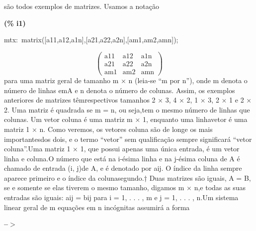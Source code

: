 \documentclass[fleqn]{article}
\begin{document}
são todos exemplos de matrizes. Usamos a notação


\noindent
\begin{minipage}[t]{4.000000em}\color{red}\bfseries
(\% i1)	
\end{minipage}
\begin{minipage}[t]{\textwidth}\color{blue}
mtx:\ matrix([a11,a12,a1n],[a21,a22,a2n],[am1,am2,amn]);
\end{minipage}
\[\displaystyle \tag{mtx} 
\begin{pmatrix}\ensuremath{\mathrm{a11}} & \ensuremath{\mathrm{a12}} & \ensuremath{\mathrm{a1n}}\\
\ensuremath{\mathrm{a21}} & \ensuremath{\mathrm{a22}} & \ensuremath{\mathrm{a2n}}\\
\ensuremath{\mathrm{am1}} & \ensuremath{\mathrm{am2}} & \ensuremath{\mathrm{amn}}\end{pmatrix}\mbox{}
\]
para uma matriz geral de tamanho m × n (leia-se “m por n”), onde m denota o número de linhas emA e n denota o número de colunas. Assim, os exemplos anteriores de matrizes têmrespectivos tamanhos 2 × 3, 4 × 2, 1 × 3, 2 × 1 e 2 × 2. Uma matriz é quadrada se m = n, ou seja,tem o mesmo número de linhas que colunas. Um vetor coluna é uma matriz m × 1, enquanto uma linhavetor é uma matriz 1 × n. Como veremos, os vetores coluna são de longe os mais importantesdos dois, e o termo “vetor” sem qualificação sempre significará “vetor coluna”.Uma matriz 1 × 1, que possui apenas uma única entrada, é um vetor linha e coluna.O número que está na i-ésima linha e na j-ésima coluna de A é chamado de entrada (i, j)de A, e é denotado por aij. O índice da linha sempre aparece primeiro e o índice da colunasegundo.† Duas matrizes são iguais, A = B, se e somente se elas tiverem o mesmo tamanho, digamos m × n,e todas as suas entradas são iguais: aij = bij para i = 1, . . . , m e j = 1, . . . , n.Um sistema linear geral de m equações em n incógnitas assumirá a forma


\noindent
\begin{minipage}[t]{4.000000em}\color{red}\bfseries
 --\ensuremath{\ensuremath{>}}	
\end{minipage}
\begin{minipage}[t]{\textwidth}\color{blue}

\end{minipage}

\noindent%
\end{document}
